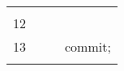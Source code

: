 \documentclass[addpoints,answers,12pt]{exam}
\begin{document}
\begin{questions}
\begin{parts}
\begin{subparts}
\begin{tabular}{|c|l|l|l|}
  &                                 &                    & \\ \hline
  &                                 &                    & \\
12 &                                &
                                                          & \\ \hline
13 &                                &                     & commit; \\
  &                                 &                    & \\ \hline
\end{tabular}

  \begin{solution}


\end{solution}
\end{subparts}
\end{parts}
\end{questions}
\end{document}
